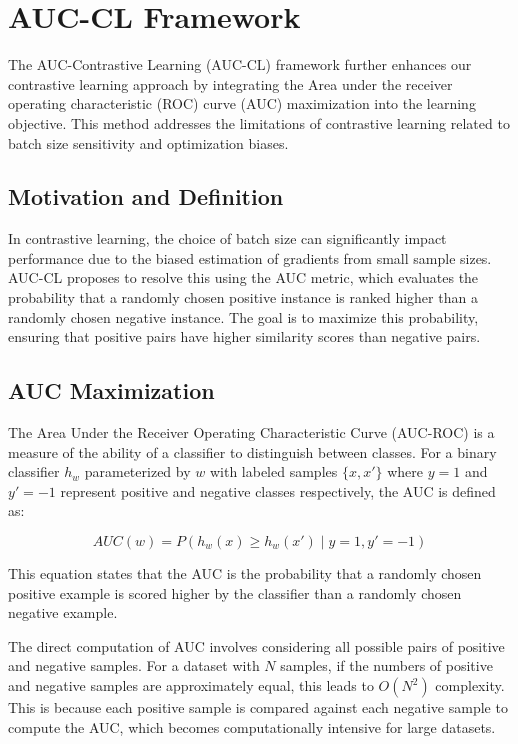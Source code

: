 \section{AUC-CL Framework}
The AUC-Contrastive Learning (AUC-CL) framework further enhances our contrastive learning approach by integrating the Area under the receiver operating characteristic (ROC) curve (AUC) maximization into the learning objective. This method addresses the limitations of contrastive learning related to batch size sensitivity and optimization biases.

\subsection{Motivation and Definition}
In contrastive learning, the choice of batch size can significantly impact performance due to the biased estimation of gradients from small sample sizes. AUC-CL proposes to resolve this using the AUC metric, which evaluates the probability that a randomly chosen positive instance is ranked higher than a randomly chosen negative instance. The goal is to maximize this probability, ensuring that positive pairs have higher similarity scores than negative pairs.

\subsection{AUC Maximization}
The Area Under the Receiver Operating Characteristic Curve (AUC-ROC) is a measure of the ability of a classifier to distinguish between classes. For a binary classifier \( h_w \) parameterized by \( w \) with labeled samples \( \{x, x'\} \) where \( y = 1 \) and \( y' = -1 \) represent positive and negative classes respectively, the AUC is defined as:

\[
AUC(w) = P(h_w(x) \geq h_w(x') \mid y = 1, y' = -1)
\]

This equation states that the AUC is the probability that a randomly chosen positive example is scored higher by the classifier than a randomly chosen negative example.

The direct computation of AUC involves considering all possible pairs of positive and negative samples. For a dataset with \( N \) samples, if the numbers of positive and negative samples are approximately equal, this leads to \( O(N^2) \) complexity. This is because each positive sample is compared against each negative sample to compute the AUC, which becomes computationally intensive for large datasets.

